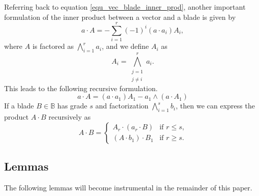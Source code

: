 \documentclass{birkjour}
\theoremstyle{definition}
\theoremstyle{remark}
\numberwithin{equation}{section}
\newcommand{\B}{\mathbb{B}}
\begin{document}
Referring back to equation \eqref{equ_vec_blade_inner_prod}, another important formulation of the inner product between a vector and a blade
is given by
\begin{equation}\label{equ_vec_blade_inner_prod_series}
a\cdot A=-\sum_{i=1}^r(-1)^i(a\cdot a_i)A_i,
\end{equation}
where $A$ is factored as $\bigwedge_{i=1}^r a_i$, and we define $A_i$ as
\begin{equation}\label{equ_A_i}
A_i=\bigwedge_{\substack{j=1\\j\neq i}}^r a_i.
\end{equation}
This leads to the following recursive formulation.
\begin{equation}
a\cdot A = (a\cdot a_1)A_1-a_1\wedge(a\cdot A_1)
\end{equation}
If a blade $B\in\B$ has grade $s$ and factorization $\bigwedge_{i=1}^s b_i$, then we can express
the product $A\cdot B$ recursively as
\begin{equation}
A\cdot B = \left\{\begin{array}{ll}
A_r\cdot(a_r\cdot B) & \mbox{if $r\leq s$,} \\
(A\cdot b_1)\cdot B_1 & \mbox{if $r\geq s$.}
\end{array}\right.
\end{equation}

\subsection{Lemmas}

The following lemmas will become instrumental in the remainder of this paper.
\end{document}
